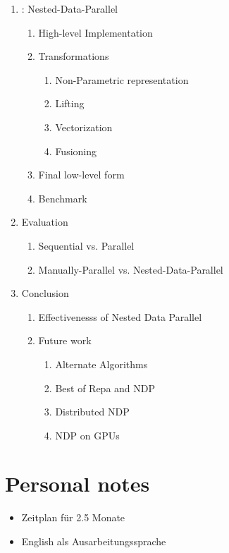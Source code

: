 \message{ !name(expose.tex)}\documentclass{article}
\begin{document}
\begin{enumerate}
        \item   : Nested-Data-Parallel
            \begin{enumerate}
            \item High-level Implementation
            \item Transformations
                \begin{enumerate}
                \item Non-Parametric representation
                \item Lifting
                \item Vectorization
                \item Fusioning
                \end{enumerate}
            \item Final low-level form

            \item Benchmark
            \end{enumerate}

        \item Evaluation
            \begin{enumerate}
            \item Sequential vs. Parallel
            \item Manually-Parallel vs. Nested-Data-Parallel
            \end{enumerate}

        \item Conclusion
            \begin{enumerate}
            \item Effectivenesss of Nested Data Parallel

            \item Future work
                \begin{enumerate}
                    \item Alternate Algorithms
                    \item Best of Repa and NDP
                    \item Distributed NDP
                    \item NDP on GPUs
                \end{enumerate}
            \end{enumerate}
        \end{enumerate}

    \newpage


    \newpage

    \section{Personal notes}

    \begin{itemize}
        \item Zeitplan für 2.5 Monate
        \item English als Ausarbeitungssprache
    \end{itemize}
\end{document}
